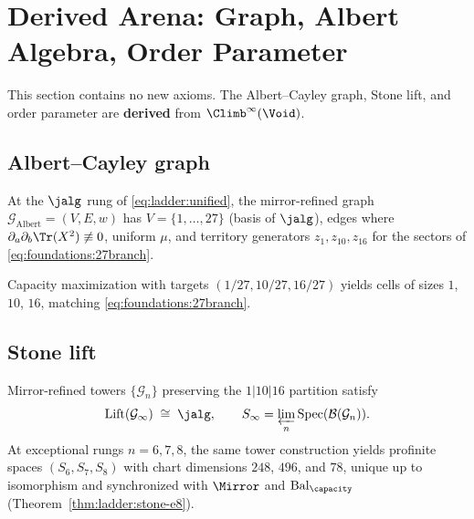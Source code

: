 \section{Derived Arena: Graph, Albert Algebra, Order Parameter}
\label{sec:foundations}

This section contains no new axioms. The Albert--Cayley graph, Stone lift, and
order parameter are \textbf{derived} from $\Climb^\infty(\Void)$.

\subsection{Albert--Cayley graph}
\label{sec:foundations:albert-graph}

\begin{definition}\label{def:foundations:albert}
At the $\jalg$ rung of \eqref{eq:ladder:unified}, the mirror-refined graph
$\mathcal{G}_{\mathrm{Albert}}=(V,E,w)$ has $V=\{1,\ldots,27\}$ (basis of
$\jalg$), edges where $\partial_a\partial_b\Tr(X^2)\not\equiv0$, uniform
$\mu$, and territory generators $z_1,z_{10},z_{16}$ for the sectors of
\eqref{eq:foundations:27branch}.
\end{definition}

\begin{proposition}\label{prop:foundations:partition}
Capacity maximization with targets $(1/27,10/27,16/27)$ yields cells of sizes
$1$, $10$, $16$, matching \eqref{eq:foundations:27branch}.
\end{proposition}

\subsection{Stone lift}
\label{sec:foundations:lift}

\begin{theorem}\label{thm:foundations:stone-lift}
Mirror-refined towers $\{\mathcal{G}_n\}$ preserving the $1|10|16$ partition
satisfy
\[
  \mathrm{Lift}(\mathcal{G}_\infty)\;\cong\;\jalg,
  \qquad
  S_\infty=\varprojlim_n\mathrm{Spec}(\mathcal{B}(\mathcal{G}_n)).
\]
At exceptional rungs $n=6,7,8$, the same tower construction yields profinite
spaces $(S_6,S_7,S_8)$ with chart dimensions $248$, $496$, and $78$, unique
up to isomorphism and synchronized with $\Mirror$ and
$\mathrm{Bal}_\capacity$ (Theorem~\ref{thm:ladder:stone-e8}).
\end{theorem}

